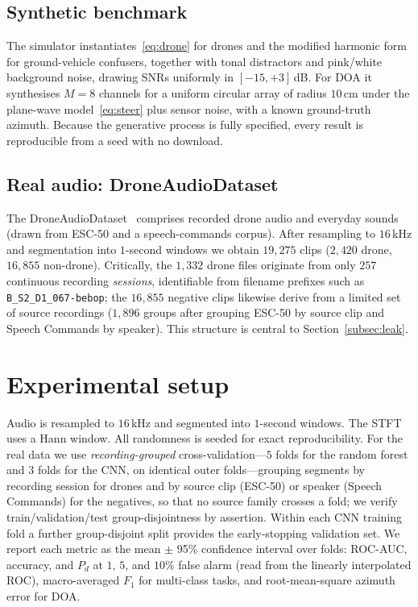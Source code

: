 \documentclass[11pt]{article}
\begin{document}
\subsection{Synthetic benchmark}
The simulator instantiates~\eqref{eq:drone} for drones and the modified harmonic
form for ground-vehicle confusers, together with tonal distractors and pink/white
background noise, drawing SNRs uniformly in $[-15,+3]$\,dB. For DOA it synthesises
$M=8$ channels for a uniform circular array of radius $10$\,cm under the
plane-wave model~\eqref{eq:steer} plus sensor noise, with a known ground-truth
azimuth. Because the generative process is fully specified, every result is
reproducible from a seed with no download.

\subsection{Real audio: DroneAudioDataset}
The DroneAudioDataset~\cite{alemadi} comprises recorded drone audio and everyday
sounds (drawn from ESC-50 and a speech-commands corpus). After resampling to
$16$\,kHz and segmentation into $1$-second windows we obtain $19{,}275$ clips
($2{,}420$ drone, $16{,}855$ non-drone). Critically, the $1{,}332$ drone files
originate from only $257$ continuous recording \emph{sessions}, identifiable from
filename prefixes such as \texttt{B\_S2\_D1\_067-bebop}; the $16{,}855$ negative
clips likewise derive from a limited set of source recordings ($1{,}896$ groups
after grouping ESC-50 by source clip and Speech Commands by speaker). This
structure is central to Section~\ref{subsec:leak}.

\section{Experimental setup}
\label{sec:setup}
Audio is resampled to $16$\,kHz and segmented into $1$-second windows. The STFT
uses a Hann window. All randomness is seeded for exact reproducibility. For the
real data we use \emph{recording-grouped} cross-validation---$5$ folds for the
random forest and $3$ folds for the CNN, on identical outer folds---grouping
segments by recording session for drones and by source clip (ESC-50) or speaker
(Speech Commands) for the negatives, so that no source family crosses a fold; we
verify train/validation/test group-disjointness by assertion. Within each CNN
training fold a further group-disjoint split provides the early-stopping
validation set. We report each metric as the mean $\pm$ 95\% confidence interval
over folds: ROC-AUC, accuracy, and $P_d$ at $1$, $5$, and $10\%$ false alarm
(read from the linearly interpolated ROC), macro-averaged $F_1$ for multi-class
tasks, and root-mean-square azimuth error for DOA.
\end{document}
